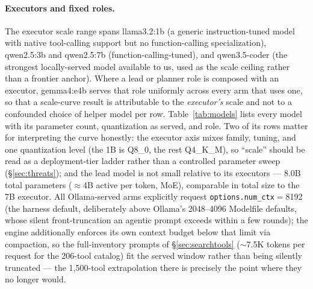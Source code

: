 \documentclass[smallcondensed,natbib]{svjour3}
\begin{document}
\paragraph{Executors and fixed roles.} The executor scale range spans
llama3.2:1b (a generic instruction-tuned model with native tool-calling
support but no function-calling specialization), qwen2.5:3b and
qwen2.5:7b (function-calling-tuned), and qwen3.5-coder (the strongest
locally-served model available to us, used as the scale ceiling rather
than a frontier anchor). Where a lead or planner role is composed with
an executor, gemma4:e4b serves that role uniformly across every arm
that uses one, so that a scale-curve result is attributable to the
\emph{executor's} scale and not to a confounded choice of helper model
per row. Table~\ref{tab:models} lists every model with its parameter
count, quantization as served, and role. Two of its rows matter for
interpreting the curve honestly: the executor axis mixes family,
tuning, and one quantization level (the 1B is Q8\_0, the rest
Q4\_K\_M), so ``scale'' should be read as a deployment-tier ladder
rather than a controlled parameter sweep (\S\ref{sec:threats}); and
the lead model is not small relative to its executors --- 8.0B total
parameters ($\approx$4B active per token, MoE), comparable in total
size to the 7B executor. All Ollama-served arms explicitly request
\texttt{options.num\_ctx}${}={}$8192 (the harness default,
deliberately above Ollama's 2048--4096 Modelfile defaults, whose
silent front-truncation an agentic prompt exceeds within a few
rounds); the engine additionally enforces its own context budget below
that limit via compaction, so the full-inventory prompts of
\S\ref{sec:searchtools} ($\sim$7.5K tokens per request for the
206-tool catalog) fit the served window rather than being silently
truncated --- the 1{,}500-tool extrapolation there is precisely the
point where they no longer would.
\end{document}
